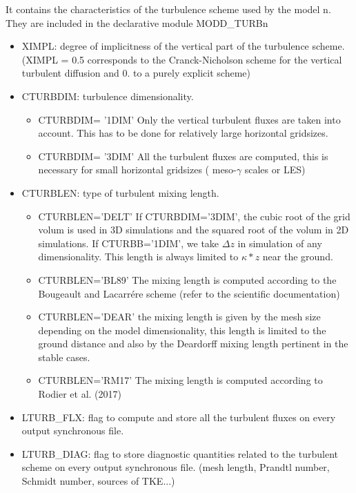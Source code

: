 It contains the characteristics of the turbulence scheme used by the model n. They are
included in the declarative module MODD\_TURBn
\begin{itemize}
\item
{}
XIMPL: degree of implicitness of the vertical part of the turbulence scheme.
(XIMPL = 0.5 corresponds to the Cranck-Nicholson scheme for the vertical
turbulent diffusion and  0. to a purely explicit scheme)
\item
{}
CTURBDIM: turbulence dimensionality. 
\begin{itemize}
\item
CTURBDIM= '1DIM'  Only the vertical turbulent fluxes are taken
into account. This has to be done for relatively large horizontal gridsizes.
\item
CTURBDIM= '3DIM'  All the turbulent fluxes are computed, this is necessary for
small horizontal gridsizes ( meso-$\gamma$ scales or LES)
\end{itemize}

\item
{}
CTURBLEN: type of turbulent mixing length.
\begin{itemize}
\item
CTURBLEN='DELT' If CTURBDIM='3DIM', the cubic root of the grid volum is used
 in 3D simulations and  the squared root of the volum in 2D simulations.
If CTURBB='1DIM', we take 
$\Delta z $ in simulation of any dimensionality. 
This length is always limited to $\kappa * z$  near the ground.
\item
CTURBLEN='BL89'
The mixing length is computed according to the Bougeault and Lacarr\'ere scheme
(refer to the scientific documentation)
\item
CTURBLEN='DEAR'
the mixing length is given by the mesh size depending on the model
dimensionality, this length is limited to the ground distance and
also by the Deardorff mixing length pertinent in the stable cases.
\item
CTURBLEN='RM17'
The mixing length is computed according to Rodier et al. (2017)
\end{itemize}

\item
{}
LTURB\_FLX: flag to compute and store all the turbulent fluxes
 on every output synchronous file.

\item
{}
LTURB\_DIAG: flag to  store diagnostic quantities related to the 
turbulent scheme  on every output synchronous file. (mesh length, Prandtl
number, Schmidt number, sources of TKE...)


\end{itemize}
